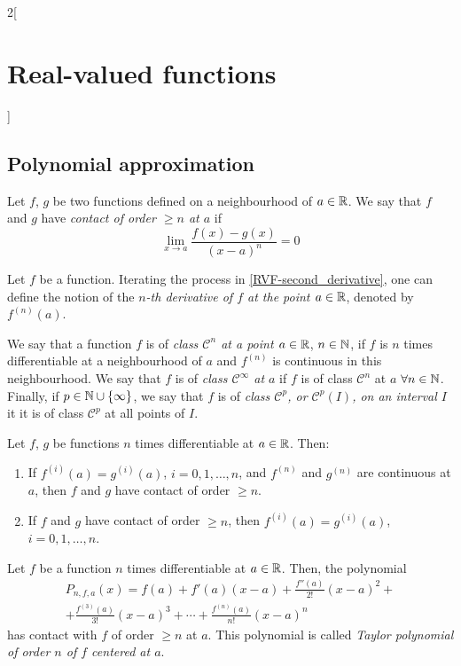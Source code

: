 \documentclass[../../../main.tex]{subfiles}
\begin{document}
\begin{multicols}{2}[\section{Real-valued functions}]
  \subsection{Polynomial approximation}
  \begin{definition}
    Let $f$, $g$ be two functions defined on a neighbourhood of $a\in\mathbb{R}$.  We say that $f$ and $g$ have \textit{contact of order $\geq n$ at $a$} if $$\lim_{x\to a}\frac{f(x)-g(x)}{{(x-a)}^n}=0$$
  \end{definition}
  \begin{definition}
    Let $f$ be a function. Iterating the process in \cref{RVF-second_derivative}, one can define the notion of the \textit{$n$-th derivative of $f$ at the point $a\in\mathbb{R}$}, denoted by $f^{(n)}(a)$.
  \end{definition}
  \begin{definition}
    We say that a function $f$ is of \textit{class $\mathcal{C}^n$ at a point $a\in\mathbb{R}$}, $n\in\mathbb{N}$, if $f$ is $n$ times differentiable at a neighbourhood of $a$ and $f^{(n)}$ is continuous in this neighbourhood. We say that $f$ is of \textit{class $\mathcal{C}^\infty$ at $a$} if $f$ is of class $\mathcal{C}^n$ at $a$ $\forall n\in\mathbb{N}$. Finally, if $p\in\mathbb{N}\cup\{\infty\}$, we say that $f$ is of \textit{class $\mathcal{C}^p$, or $\mathcal{C}^p(I)$, on an interval $I$} it it is of class $\mathcal{C}^p$ at all points of $I$.
  \end{definition}
  \begin{lemma}
    Let $f$, $g$ be functions $n$ times differentiable at $a\in\mathbb{R}$. Then:
    \begin{enumerate}
      \item If $f^{(i)}(a)=g^{(i)}(a)$, $i=0,1,\ldots,n$, and $f^{(n)}$ and $g^{(n)}$ are continuous at $a$, then $f$ and $g$ have contact of order $\geq n$.
      \item If $f$ and $g$ have contact of order $\geq n$, then $f^{(i)}(a)=g^{(i)}(a)$, $i=0,1,\ldots,n$.
    \end{enumerate}
  \end{lemma}
  \begin{theorem}
    Let $f$ be a function $n$ times differentiable at $a\in\mathbb{R}$. Then, the polynomial
    \begin{multline*}
      P_{n,f,a}(x)=f(a)+f'(a)(x-a)+\frac{f''(a)}{2!}{(x-a)}^2+\\+\frac{f^{(3)}(a)}{3!}{(x-a)}^3+\cdots+\frac{f^{(n)}(a)}{n!}{(x-a)}^n
    \end{multline*}
    has contact with $f$ of order $\geq n$ at $a$. This polynomial is called \textit{Taylor polynomial of order $n$ of $f$ centered at $a$}.

\end{theorem}
\end{multicols}
\end{document}
